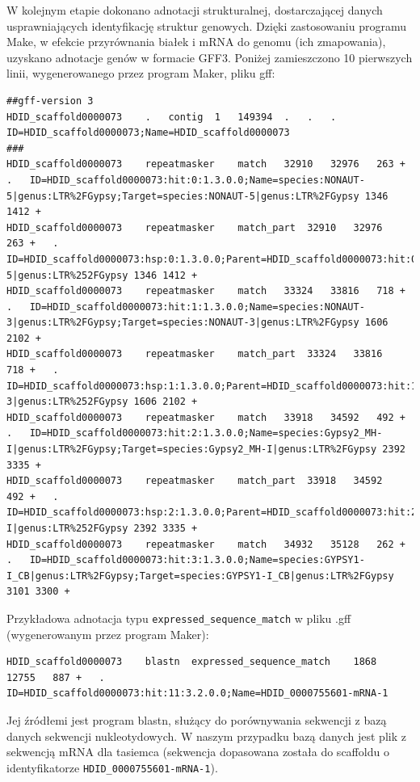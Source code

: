 \documentclass[a4paper]{article}
\begin{document}
W kolejnym etapie dokonano adnotacji strukturalnej, dostarczającej danych usprawniających identyfikację struktur genowych. Dzięki zastosowaniu programu Make, w efekcie przyrównania białek i mRNA do genomu (ich zmapowania), uzyskano adnotacje genów w formacie GFF3.
Poniżej zamieszczono 10 pierwszych linii, wygenerowanego przez program Maker, pliku gff:
\begin{lstlisting}
##gff-version 3
HDID_scaffold0000073	.	contig	1	149394	.	.	.	ID=HDID_scaffold0000073;Name=HDID_scaffold0000073
###
HDID_scaffold0000073	repeatmasker	match	32910	32976	263	+	.	ID=HDID_scaffold0000073:hit:0:1.3.0.0;Name=species:NONAUT-5|genus:LTR%2FGypsy;Target=species:NONAUT-5|genus:LTR%2FGypsy 1346 1412 +
HDID_scaffold0000073	repeatmasker	match_part	32910	32976	263	+	.	ID=HDID_scaffold0000073:hsp:0:1.3.0.0;Parent=HDID_scaffold0000073:hit:0:1.3.0.0;Target=species:NONAUT-5|genus:LTR%252FGypsy 1346 1412 +
HDID_scaffold0000073	repeatmasker	match	33324	33816	718	+	.	ID=HDID_scaffold0000073:hit:1:1.3.0.0;Name=species:NONAUT-3|genus:LTR%2FGypsy;Target=species:NONAUT-3|genus:LTR%2FGypsy 1606 2102 +
HDID_scaffold0000073	repeatmasker	match_part	33324	33816	718	+	.	ID=HDID_scaffold0000073:hsp:1:1.3.0.0;Parent=HDID_scaffold0000073:hit:1:1.3.0.0;Target=species:NONAUT-3|genus:LTR%252FGypsy 1606 2102 +
HDID_scaffold0000073	repeatmasker	match	33918	34592	492	+	.	ID=HDID_scaffold0000073:hit:2:1.3.0.0;Name=species:Gypsy2_MH-I|genus:LTR%2FGypsy;Target=species:Gypsy2_MH-I|genus:LTR%2FGypsy 2392 3335 +
HDID_scaffold0000073	repeatmasker	match_part	33918	34592	492	+	.	ID=HDID_scaffold0000073:hsp:2:1.3.0.0;Parent=HDID_scaffold0000073:hit:2:1.3.0.0;Target=species:Gypsy2_MH-I|genus:LTR%252FGypsy 2392 3335 +
HDID_scaffold0000073	repeatmasker	match	34932	35128	262	+	.	ID=HDID_scaffold0000073:hit:3:1.3.0.0;Name=species:GYPSY1-I_CB|genus:LTR%2FGypsy;Target=species:GYPSY1-I_CB|genus:LTR%2FGypsy 3101 3300 +
\end{lstlisting}

Przykładowa adnotacja typu \texttt{expressed\_sequence\_match} w pliku .gff (wygenerowanym przez program Maker):
\begin{lstlisting}
HDID_scaffold0000073	blastn	expressed_sequence_match	1868	12755	887	+	.	ID=HDID_scaffold0000073:hit:11:3.2.0.0;Name=HDID_0000755601-mRNA-1
\end{lstlisting}

Jej źródłemi jest program blastn, służący do porównywania sekwencji z bazą danych sekwencji nukleotydowych.
W naszym przypadku bazą danych jest plik z sekwencją mRNA dla tasiemca
(sekwencja dopasowana została do scaffoldu o identyfikatorze \texttt{HDID\_0000755601-mRNA-1}).
\end{document}
